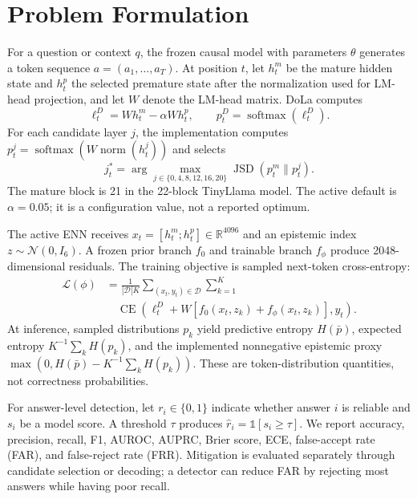 \documentclass[conference]{IEEEtran}
\begin{document}
\section{Problem Formulation}
For a question or context $q$, the frozen causal model with parameters $\theta$ generates a token sequence $a=(a_1,\ldots,a_T)$. At position $t$, let $h_t^m$ be the mature hidden state and $h_t^p$ the selected premature state after the normalization used for LM-head projection, and let $W$ denote the LM-head matrix. DoLa computes
\begin{equation}
\ell_t^{D}=W h_t^m-\alpha W h_t^p,\qquad p_t^{D}=\operatorname{softmax}(\ell_t^{D}).
\label{eq:dola}
\end{equation}
For each candidate layer $j$, the implementation computes $p_t^j=\operatorname{softmax}(W\operatorname{norm}(h_t^j))$ and selects
\begin{equation}
j_t^*=\arg\max_{j\in\{0,4,8,12,16,20\}} \operatorname{JSD}(p_t^m\|p_t^j).
\label{eq:jsd}
\end{equation}
The mature block is 21 in the 22-block TinyLlama model. The active default is $\alpha=0.05$; it is a configuration value, not a reported optimum.

The active ENN receives $x_t=[h_t^m;h_t^p]\in\mathbb{R}^{4096}$ and an epistemic index $z\sim\mathcal{N}(0,I_6)$. A frozen prior branch $f_0$ and trainable branch $f_\phi$ produce 2048-dimensional residuals. The training objective is sampled next-token cross-entropy:
\begin{equation}
\begin{aligned}
\mathcal{L}(\phi)
&=\frac{1}{|\mathcal{D}|K}\sum_{(x_t,y_t)\in\mathcal{D}}\sum_{k=1}^{K}\\[-2pt]
&\quad \operatorname{CE}\left(\ell_t^D+W[f_0(x_t,z_k)+f_\phi(x_t,z_k)],y_t\right).
\end{aligned}
\label{eq:ennloss}
\end{equation}
At inference, sampled distributions $p_k$ yield predictive entropy $H(\bar p)$, expected entropy $K^{-1}\sum_kH(p_k)$, and the implemented nonnegative epistemic proxy $\max(0,H(\bar p)-K^{-1}\sum_kH(p_k))$. These are token-distribution quantities, not correctness probabilities.

For answer-level detection, let $r_i\in\{0,1\}$ indicate whether answer $i$ is reliable and $s_i$ be a model score. A threshold $\tau$ produces $\hat r_i=\mathbb{1}[s_i\geq\tau]$. We report accuracy, precision, recall, F1, AUROC, AUPRC, Brier score, ECE, false-accept rate (FAR), and false-reject rate (FRR). Mitigation is evaluated separately through candidate selection or decoding; a detector can reduce FAR by rejecting most answers while having poor recall.
\end{document}
